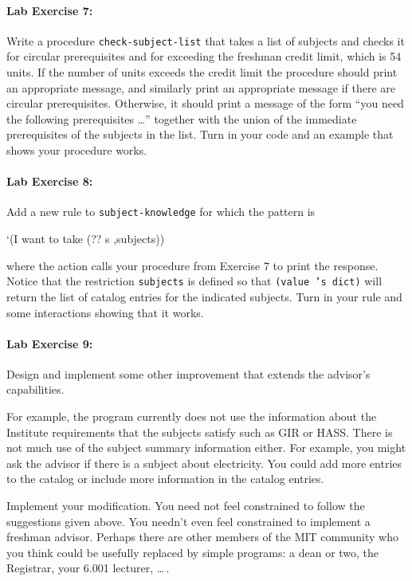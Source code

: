 \paragraph{Lab Exercise 7:}
Write a procedure {\tt check-subject-list} that takes a list of
subjects and checks it for circular prerequisites and for exceeding
the freshman credit limit, which is 54 units.  If the number of units
exceeds the credit limit the procedure should print an appropriate
message, and similarly print an appropriate message if there are
circular prerequisites.  Otherwise, it should print a message of the
form ``you need the following prerequisites \ldots'' together with the
union of the immediate prerequisites of the subjects in the list.
Turn in your code and an example that shows your procedure works.

\paragraph{Lab Exercise 8:}
Add a new rule to {\tt subject-knowledge} for which the pattern is

\beginlisp
`(I want to take (?? s ,subjects))
\endlisp

\noindent where the action calls your procedure from Exercise 7 to
print the response.  Notice that the restriction {\tt subjects} is
defined so that {\tt (value 's dict)} will return the list of
catalog entries for the indicated subjects.  Turn in your rule and
some interactions showing that it works.

\paragraph{Lab Exercise 9:}
Design and implement some other improvement that extends the advisor's
capabilities. 

For example, the program currently does not use the information about the
Institute requirements that the subjects satisfy such as GIR or HASS.
There is not much use of the subject summary information either.
For example, you might ask the advisor if there is a subject about
electricity.  You could add more entries to the catalog or include more 
information in the catalog entries.

Implement your modification.  You need not feel constrained to follow
the suggestions given above.  You needn't even feel constrained to
implement a freshman advisor.  Perhaps there are other members of the
MIT community who you think could be usefully replaced by simple
programs: a dean or two, the Registrar, your 6.001 lecturer, \ldots\,.

